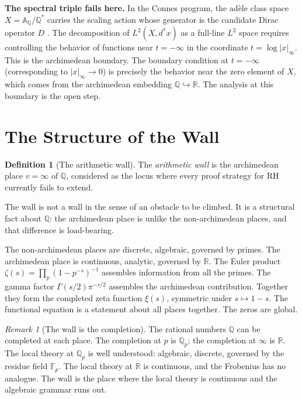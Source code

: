 \documentclass[12pt]{article}
\theoremstyle{definition}
\newtheorem{definition}[theorem]{Definition}
\theoremstyle{remark}
\newtheorem{remark}[theorem]{Remark}
\begin{document}
\textbf{The spectral triple fails here.}
In the Connes program, the adèle class space
$X = \mathbb{A}_\mathbb{Q}/\mathbb{Q}^*$ carries the scaling action
whose generator is the candidate Dirac operator $D$ \cite{deficiency}.
The decomposition of $L^2(X, d^*x)$ as a full-line $L^2$ space
requires controlling the behavior of functions near $t = -\infty$
in the coordinate $t = \log|x|_\infty$.
This is the archimedean boundary.
The boundary condition at $t = -\infty$
(corresponding to $|x|_\infty \to 0$)
is precisely the behavior near the zero element of $X$,
which comes from the archimedean embedding $\mathbb{Q} \hookrightarrow \mathbb{R}$.
The analysis at this boundary is the open step.

\section{The Structure of the Wall}

\begin{definition}[The arithmetic wall]
The \emph{arithmetic wall} is the archimedean place $v = \infty$ of $\mathbb{Q}$,
considered as the locus where every proof strategy for RH
currently fails to extend.
\end{definition}

The wall is not a wall in the sense of an obstacle to be climbed.
It is a structural fact about $\mathbb{Q}$:
the archimedean place is unlike the non-archimedean places,
and that difference is load-bearing.

The non-archimedean places are discrete, algebraic, governed by primes.
The archimedean place is continuous, analytic, governed by $\mathbb{R}$.
The Euler product $\zeta(s) = \prod_p (1-p^{-s})^{-1}$ assembles information from all the primes.
The gamma factor $\Gamma(s/2)\pi^{-s/2}$ assembles the archimedean contribution.
Together they form the completed zeta function $\xi(s)$,
symmetric under $s \mapsto 1-s$.
The functional equation is a statement about all places together.
The zeros are global.

\begin{remark}[The wall is the completion]
The rational numbers $\mathbb{Q}$ can be completed at each place.
The completion at $p$ is $\mathbb{Q}_p$; the completion at $\infty$ is $\mathbb{R}$.
The local theory at $\mathbb{Q}_p$ is well understood:
algebraic, discrete, governed by the residue field $\mathbb{F}_p$.
The local theory at $\mathbb{R}$ is continuous,
and the Frobenius has no analogue.
The wall is the place where the local theory is continuous
and the algebraic grammar runs out.
\end{remark}
\end{document}
